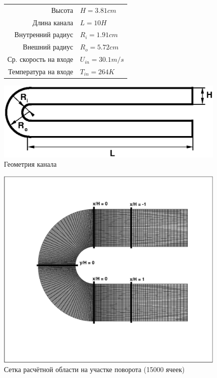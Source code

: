 \begin{figure}[h]
	\begin{minipage}{0.5\linewidth}
			\begin{tabular}{r l}
				\hline
				\label{tableUDuct}
				Высота & $H=3.81cm$ \\
				Длина канала & $L = 10H$ \\
				Внутренний радиус & $R_i = 1.91cm$ \\
				Внешний радиус & $R_o = 5.72cm$ \\
				Ср. скорость на входе & $U_{in} = 30.1 m/s$ \\
				Температура на входе & $T_{in} = 264 K$ \\
			\end{tabular}
	\end{minipage}
	\hspace{2em}
	\begin{minipage}{0.4\linewidth}
		\begin{flushright}
		\includegraphics[scale=0.4]{UDuct}
		\caption{Геометрия канала}
		\end{flushright}
	\end{minipage}
\end{figure}
\newpage
\begin{figure}[h]
	\centering
	\includegraphics[scale=0.6]{sampleLinesAndMesh}
	\caption{Сетка расчётной области на участке поворота (15000 ячеек)}
	\label{fig:sampleLinesAndMesh}
\end{figure}
